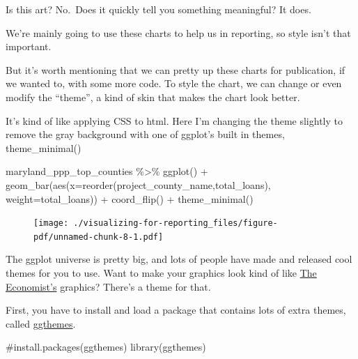\documentclass[
  letterpaper,
  DIV=11,
  numbers=noendperiod]{scrreprt}
\newenvironment{Shaded}{\begin{snugshade}}{\end{snugshade}}
\newcommand{\AttributeTok}[1]{\textcolor[rgb]{0.40,0.45,0.13}{#1}}
\newcommand{\CommentTok}[1]{\textcolor[rgb]{0.37,0.37,0.37}{#1}}
\newcommand{\FunctionTok}[1]{\textcolor[rgb]{0.28,0.35,0.67}{#1}}
\newcommand{\NormalTok}[1]{\textcolor[rgb]{0.00,0.23,0.31}{#1}}
\newcommand{\SpecialCharTok}[1]{\textcolor[rgb]{0.37,0.37,0.37}{#1}}
\begin{document}
Is this art? No.~Does it quickly tell you something meaningful? It does.

We're mainly going to use these charts to help us in reporting, so style
isn't that important.

But it's worth mentioning that we can pretty up these charts for
publication, if we wanted to, with some more code. To style the chart,
we can change or even modify the ``theme'', a kind of skin that makes
the chart look better.

It's kind of like applying CSS to html. Here I'm changing the theme
slightly to remove the gray background with one of ggplot's built in
themes, theme\_minimal()

\begin{Shaded}
\begin{Highlighting}[]
\NormalTok{maryland\_ppp\_top\_counties }\SpecialCharTok{\%\textgreater{}\%}
  \FunctionTok{ggplot}\NormalTok{() }\SpecialCharTok{+}
  \FunctionTok{geom\_bar}\NormalTok{(}\FunctionTok{aes}\NormalTok{(}\AttributeTok{x=}\FunctionTok{reorder}\NormalTok{(project\_county\_name,total\_loans), }\AttributeTok{weight=}\NormalTok{total\_loans)) }\SpecialCharTok{+}
  \FunctionTok{coord\_flip}\NormalTok{() }\SpecialCharTok{+}
  \FunctionTok{theme\_minimal}\NormalTok{()}
\end{Highlighting}
\end{Shaded}

\begin{figure}[H]

{\centering \texttt{[image: ./visualizing-for-reporting\_files/figure-pdf/unnamed-chunk-8-1.pdf]}

}

\end{figure}

The ggplot universe is pretty big, and lots of people have made and
released cool themes for you to use. Want to make your graphics look
kind of like \href{https://www.economist.com/}{The Economist's}
graphics? There's a theme for that.

First, you have to install and load a package that contains lots of
extra themes, called
\href{https://yutannihilation.github.io/allYourFigureAreBelongToUs/ggthemes/}{ggthemes}.

\begin{Shaded}
\begin{Highlighting}[]
\CommentTok{\#install.packages(\textquotesingle{}ggthemes\textquotesingle{})}
\FunctionTok{library}\NormalTok{(ggthemes)}
\end{Highlighting}
\end{Shaded}
\end{document}
